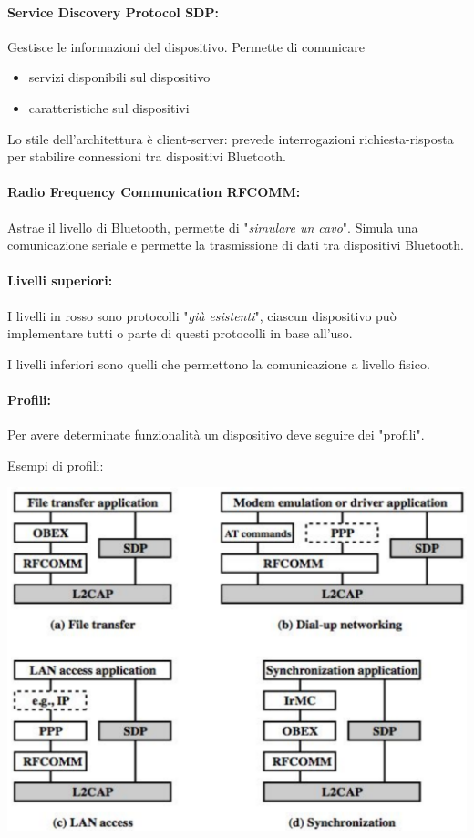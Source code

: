 \paragraph{Service Discovery Protocol SDP:} Gestisce le informazioni del dispositivo. Permette di comunicare
\begin{itemize}
	\item servizi disponibili sul dispositivo
    
	\item caratteristiche sul dispositivi
\end{itemize}

Lo stile dell'architettura è client-server: prevede interrogazioni richiesta-risposta per stabilire connessioni tra dispositivi Bluetooth.

\paragraph{Radio Frequency Communication RFCOMM:} Astrae il livello di Bluetooth, permette di "\textit{simulare un cavo}". Simula una comunicazione seriale e permette la trasmissione di dati tra dispositivi Bluetooth.

\paragraph{Livelli superiori:} I livelli in rosso sono protocolli "\textit{già esistenti}", ciascun dispositivo può implementare tutti o parte di questi protocolli in base all'uso. 

I livelli inferiori sono quelli che permettono la comunicazione a livello fisico.

\paragraph{Profili:} Per avere determinate funzionalità un dispositivo deve seguire dei "profili". 

Esempi di profili:
\begin{center}
	\includegraphics[width=0.8\linewidth]{img/wpan/profiles}
\end{center}

